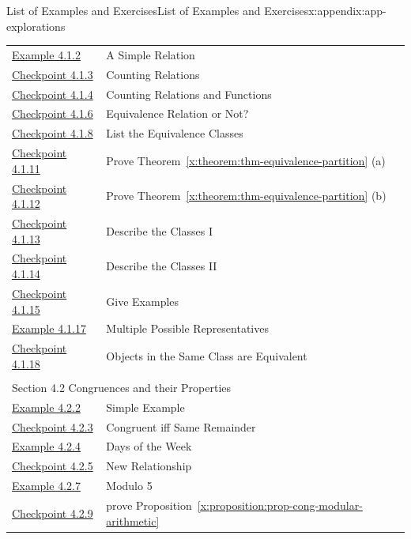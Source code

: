 \documentclass[oneside,10pt,]{book}
\newcommand{\xreffont}{\relax}
\numberwithin{equation}{section}
\begin{document}
\begin{appendixptx}{List of Examples and Exercises}{}{List of Examples and Exercises}{}{}{x:appendix:app-explorations}
\begin{longtable}[l]{ll}
\hyperref[x:example:eg-cong-relation]{Example 4.1.2}& A Simple Relation\\
\hyperref[x:exercise:ex-cong-relation-count]{Checkpoint 4.1.3}& Counting Relations\\
\hyperref[x:exercise:ex-cong-relation-count-2]{Checkpoint 4.1.4}& Counting Relations and Functions\\
\hyperref[x:exercise:ex-cong-equivalence-check]{Checkpoint 4.1.6}& Equivalence Relation or Not?\\
\hyperref[x:exercise:ex-cong-equivalence-class]{Checkpoint 4.1.8}& List the Equivalence Classes\\
\hyperref[x:exercise:ex-cong-equivalence-partition-proof-a]{Checkpoint 4.1.11}& Prove Theorem~{\xreffont\ref*{x:theorem:thm-equivalence-partition}} (a)\\
\hyperref[x:exercise:ex-cong-equivalence-partition-proof-b]{Checkpoint 4.1.12}& Prove Theorem~{\xreffont\ref*{x:theorem:thm-equivalence-partition}} (b)\\
\hyperref[x:exercise:ex-cong-equivalence-mod3]{Checkpoint 4.1.13}& Describe the Classes I\\
\hyperref[x:exercise:ex-cong-equivalence-largest]{Checkpoint 4.1.14}& Describe the Classes II\\
\hyperref[x:exercise:ex-cong-euivalence-example]{Checkpoint 4.1.15}& Give Examples\\
\hyperref[x:example:eg-cong-equivalence-even]{Example 4.1.17}& Multiple Possible Representatives\\
\hyperref[x:exercise:ex-cong-euivalence-prove-property]{Checkpoint 4.1.18}& Objects in the Same Class are Equivalent\\
\multicolumn{2}{l}{\null}\\[1.5ex] \multicolumn{2}{l}{\large Section 4.2 Congruences and their Properties}\\[0.5ex]
\hyperref[x:example:eg-cong-example]{Example 4.2.2}& Simple Example\\
\hyperref[x:exercise:ex-cong-remainder]{Checkpoint 4.2.3}& Congruent iff Same Remainder\\
\hyperref[x:example:eg-cong-week]{Example 4.2.4}& Days of the Week\\
\hyperref[x:exercise:eg-cong-week-2]{Checkpoint 4.2.5}& New Relationship\\
\hyperref[x:example:eg-cong-mod5]{Example 4.2.7}& Modulo 5\\
\hyperref[x:exercise:ex-cong-prove-modular-arithmetic]{Checkpoint 4.2.9}& prove Proposition~{\xreffont\ref*{x:proposition:prop-cong-modular-arithmetic}}\\

\end{longtable}
\end{appendixptx}
\end{document}
